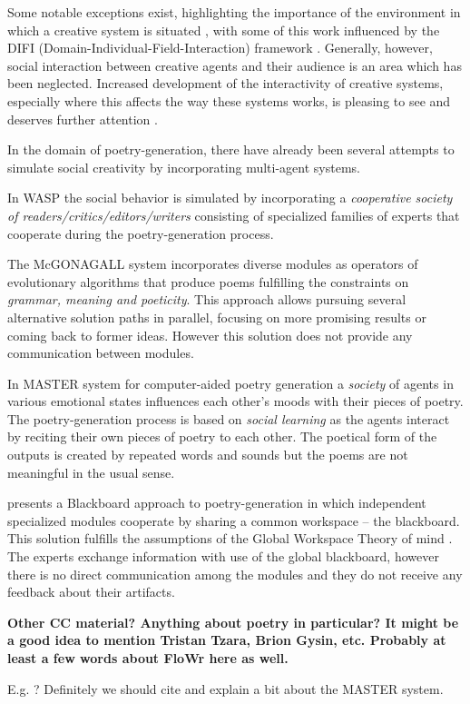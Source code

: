 Some notable exceptions exist, highlighting the importance of the
environment in which a creative system is situated \cite{mcgraw93,
  sosa09, perezyperez10MM, pease10, saunders12}, with some of this
work influenced by the DIFI (Domain-Individual-Field-Interaction)
framework \cite{csik88}. Generally, however, social interaction
between creative agents and their audience is an area which has been
neglected. Increased development of the interactivity of creative
systems, especially where this affects the way these systems works, is
pleasing to see and deserves further attention
\cite{coltonwiggins12}.

In the domain of poetry-generation, there have already been several attempts to simulate social creativity by incorporating multi-agent systems. 

In WASP \cite{gervas01,gervas10}  the social behavior is simulated by incorporating a \emph{cooperative society of readers/critics/editors/writers} consisting of specialized families of experts that cooperate during the poetry-generation process.

The McGONAGALL system \cite{manurung12} incorporates diverse modules as operators of evolutionary algorithms that produce poems fulfilling the constraints on \emph{grammar, meaning and poeticity}.  This approach allows pursuing several alternative solution paths in parallel, focusing on more promising results or coming back to former ideas. However this solution does not provide any communication between modules.

In MASTER system for computer-aided poetry generation \cite{kirke13} a \emph{society} of agents in various emotional states influences each other's moods with their pieces of poetry. The poetry-generation process is based on \emph{social learning} as the agents interact by reciting their own pieces of poetry to each other. The poetical form of the outputs is created by repeated words and sounds but the poems are not meaningful in the usual sense. 

\cite{misztal14} presents a Blackboard approach to poetry-generation in which independent specialized modules cooperate by sharing a common workspace -- the blackboard. This solution fulfills the assumptions of  the Global Workspace Theory of mind  \cite{baars97,baars03}. The experts exchange information with use of the global blackboard, however there is no direct communication among the modules and they do not receive any feedback about their artifacts.



\begin{mdframed}
\textbf{Other CC material?  Anything about poetry in particular?  It
  might be a good idea to mention Tristan Tzara, Brion Gysin, etc.
  Probably at least a few words about FloWr here as well.}

 E.g. \cite{jordanous10}?  Definitely we should cite
\cite{misztal2014poetry} and explain a bit about the MASTER system.
\end{mdframed}

